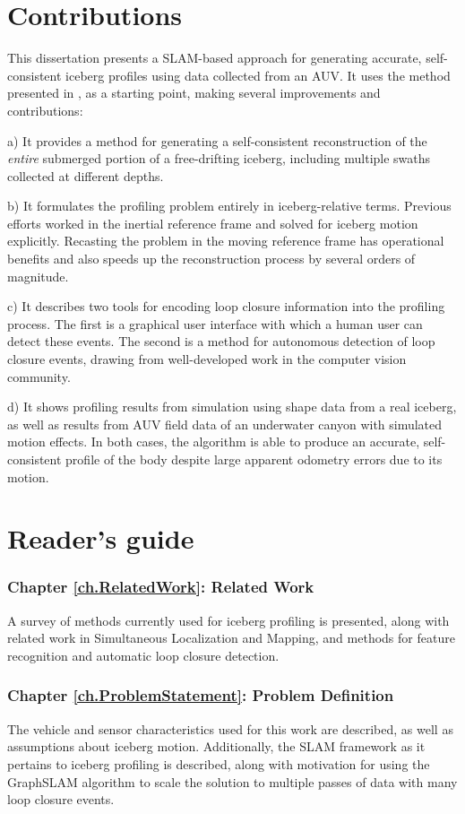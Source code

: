 \section{Contributions}

This dissertation presents a SLAM-based approach for generating accurate, self-consistent iceberg profiles using data collected from an AUV. It uses the method presented in \cite{Kimball2011b}, as a starting point, making several improvements and contributions: 

a) It provides a method for generating a self-consistent reconstruction of the \emph{entire} submerged portion of a free-drifting iceberg, including multiple swaths collected at different depths. 

b) It formulates the profiling problem entirely in iceberg-relative terms. Previous efforts worked in the inertial reference frame and solved for iceberg motion explicitly. Recasting the problem in the moving reference frame has operational benefits and also speeds up the reconstruction process by several orders of magnitude. 

c) It describes two tools for encoding loop closure information into the profiling process. The first is a graphical user interface with which a human user can detect these events. The second is a method for autonomous detection of loop closure events, drawing from well-developed work in the computer vision community.

d) It shows profiling results from simulation using shape data from a real iceberg, as well as results from AUV field data of an underwater canyon with simulated motion effects. In both cases, the algorithm is able to produce an accurate, self-consistent profile of the body despite large apparent odometry errors due to its motion.  

\section{Reader's guide}

\subsubsection*{Chapter \ref{ch.RelatedWork}: Related Work} A survey of methods currently used for iceberg profiling is presented, along with related work in Simultaneous Localization and Mapping, and methods for feature recognition and automatic loop closure detection.

\subsubsection*{Chapter \ref{ch.ProblemStatement}: Problem Definition} The vehicle and sensor characteristics used for this work are described, as well as assumptions about iceberg motion. Additionally, the SLAM framework as it pertains to iceberg profiling is described, along with motivation for using the GraphSLAM algorithm to scale the solution to multiple passes of data with many loop closure events.

